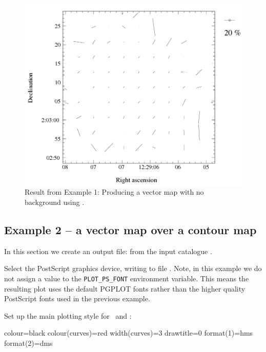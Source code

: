 \begin{figure}[t!]
\begin{center}
\includegraphics[width=0.75\linewidth]{sc22-kappa-plots-plot1.png}
\caption [Vector map with polplot]{ Result from Example 1: Producing a
  vector map with no background using .}
\label{fig:kappa-plot1}
\end{center}
\end{figure}

\subsection{ Example 2 -- a vector map over a contour map}
\label{section:kappa-example2}


In this section we create an output file:  from the input
catalogue .

Select the PostScript graphics device, writing to file .
Note, in this example we do not assign a value to the \texttt{PLOT\_PS\_FONT}
environment variable. This means the resulting plot uses the default PGPLOT
fonts rather than the higher quality PostScript fonts used in the previous
example.

\begin{terminalv}
\end{terminalv}

Set up the main plotting style for \contour\ and :

\begin{terminalv}
colour=black
colour(curves)=red
width(curves)=3
drawtitle=0
format(1)=hms
format(2)=dms
\end{terminalv}


